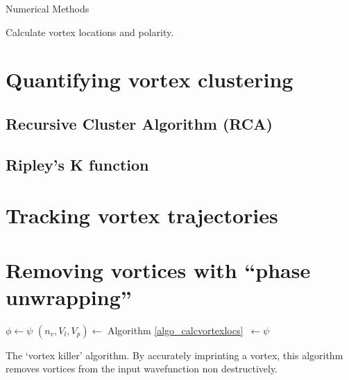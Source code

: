 \begin{chapter}{\label{cha:numerics}Numerical Methods}
\begin{algorithm}
	\caption{Calculate vortex locations and polarity.}\label{algo_calcvortexlocs}
	\end{algorithm}
\DecMargin{1em}



\section{\label{section:vortexclustering} Quantifying vortex clustering}
	\subsection{\label{section:reevesalgorithm} Recursive Cluster Algorithm (RCA) }
	\subsection{\label{section:ripleysk} Ripley's K function }
\section{\label{section:vortextracking} Tracking vortex trajectories}
\section{\label{section:vortexremoval} Removing vortices with ``phase unwrapping''}
\IncMargin{1em}
	\begin{algorithm}
	\BlankLine
	$\phi \leftarrow \psi$\;
	$(n_v,V_l,V_p)\leftarrow$ Algorithm \ref{algo_calcvortexlocs}~$\leftarrow\psi$\;


	\caption{The `vortex killer' algorithm. By accurately imprinting a vortex, this algorithm removes vortices from the input wavefunction non destructively.}\label{algo_vortexkiller}
	\end{algorithm}
\DecMargin{1em}

\end{chapter}
